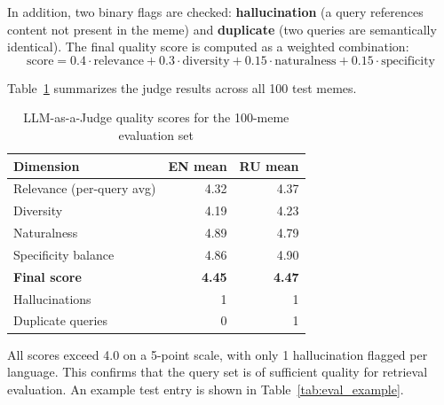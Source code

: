 \documentclass[a4paper,12pt]{article}
\begin{document}
In addition, two binary flags are checked: \textbf{hallucination} (a query references content not present in the meme) and \textbf{duplicate} (two queries are semantically identical). The final quality score is computed as a weighted combination:
\begin{equation}
\label{eq:judge_score}
\text{score} = 0.4 \cdot \text{relevance} + 0.3 \cdot \text{diversity} + 0.15 \cdot \text{naturalness} + 0.15 \cdot \text{specificity}
\end{equation}

Table~\ref{tab:judge_scores} summarizes the judge results across all 100 test memes.

\begin{table}[H]
\centering
\caption{LLM-as-a-Judge quality scores for the 100-meme evaluation set}
\label{tab:judge_scores}
\begin{tabular}{|l|r|r|}
\hline
\textbf{Dimension} & \textbf{EN mean} & \textbf{RU mean} \\
\hline
Relevance (per-query avg) & 4.32 & 4.37 \\
\hline
Diversity & 4.19 & 4.23 \\
\hline
Naturalness & 4.89 & 4.79 \\
\hline
Specificity balance & 4.86 & 4.90 \\
\hline
\textbf{Final score} & \textbf{4.45} & \textbf{4.47} \\
\hline
Hallucinations & 1 & 1 \\
\hline
Duplicate queries & 0 & 1 \\
\hline
\end{tabular}
\end{table}

All scores exceed 4.0 on a 5-point scale, with only 1 hallucination flagged per language. This confirms that the query set is of sufficient quality for retrieval evaluation. An example test entry is shown in Table~\ref{tab:eval_example}.
\end{document}
